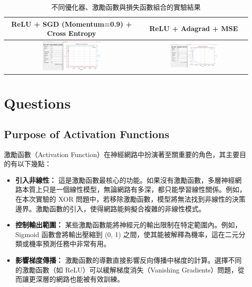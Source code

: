 \documentclass{article}
\begin{document}
\begin{table}[h!]
    \centering
    \caption{不同優化器、激勵函數與損失函數組合的實驗結果}
    \label{tab:extra_impl_comparison}
    \begin{tabular}{|c|c|}
        \hline
        \textbf{ReLU + SGD (Momentum=0.9) + Cross Entropy} & \textbf{ReLU + Adagrad + MSE} \\
        \hline
        \includegraphics[width=0.45\textwidth]{Lab01_report/img/4.4_relu_sgd_cross.png} &
        \includegraphics[width=0.45\textwidth]{Lab01_report/img/4.4_relu_adagrad_mse.png} \\
        \hline
    \end{tabular}
\end{table}

\section{Questions}

\subsection{Purpose of Activation Functions}
激勵函數（Activation Function）在神經網路中扮演著至關重要的角色，其主要目的有以下幾點：
\begin{itemize}
    \item \textbf{引入非線性：} 這是激勵函數最核心的功能。如果沒有激勵函數，多層神經網路本質上只是一個線性模型，無論網路有多深，都只能學習線性關係。例如，在本次實驗的 XOR 問題中，若移除激勵函數，模型將無法找到非線性的決策邊界。激勵函數的引入，使得網路能夠擬合複雜的非線性模式。
    \item \textbf{控制輸出範圍：} 某些激勵函數能將神經元的輸出限制在特定範圍內。例如，Sigmoid 函數會將輸出壓縮到 (0, 1) 之間，使其能被解釋為機率，這在二元分類或機率預測任務中非常有用。
    \item \textbf{影響梯度傳播：} 激勵函數的導數直接影響反向傳播中梯度的計算。選擇不同的激勵函數（如 ReLU）可以緩解梯度消失（Vanishing Gradients）問題，從而讓更深層的網路也能被有效訓練。
\end{itemize}
\end{document}
